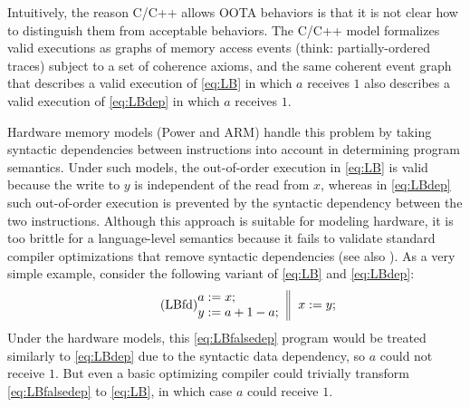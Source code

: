 Intuitively, the reason C/C++ allows OOTA behaviors is that it is not
clear how to distinguish them from acceptable behaviors.  The C/C++
model formalizes valid executions as graphs of memory access events
(think: partially-ordered traces) subject to a set of coherence
axioms, and the same coherent event graph that describes a valid
execution of \ref{eq:LB} in which $a$ receives $1$ also describes a valid
execution of \ref{eq:LBdep} in which $a$ receives $1$.


Hardware memory models (\eg Power and ARM) handle this problem by
taking syntactic dependencies between instructions into account in
determining program semantics.  Under such models, the out-of-order
execution in \ref{eq:LB} is valid because the write to $y$ is independent of
the read from $x$, whereas in \ref{eq:LBdep} such out-of-order execution is
prevented by the syntactic dependency between the two instructions.
Although this approach is suitable for modeling hardware, it is too
brittle for a language-level semantics because it fails to validate
standard compiler optimizations that remove syntactic dependencies (see also \cite{Boehm2014}).
As a very simple example, consider the following variant of \ref{eq:LB} and
\ref{eq:LBdep}:
\begin{equation}\label{eq:LBfalsedep}\tag{LBfd}
\inarrII{ a:=x; \\ y:=a+1-a; }{ x:=y; }
\end{equation}
Under the hardware models, this \ref{eq:LBfalsedep} program would be treated
similarly to \ref{eq:LBdep} due to the syntactic data dependency, so $a$ could
not receive $1$.  But even a basic optimizing compiler could trivially
transform \ref{eq:LBfalsedep} to \ref{eq:LB}, in which case $a$ could receive $1$.



